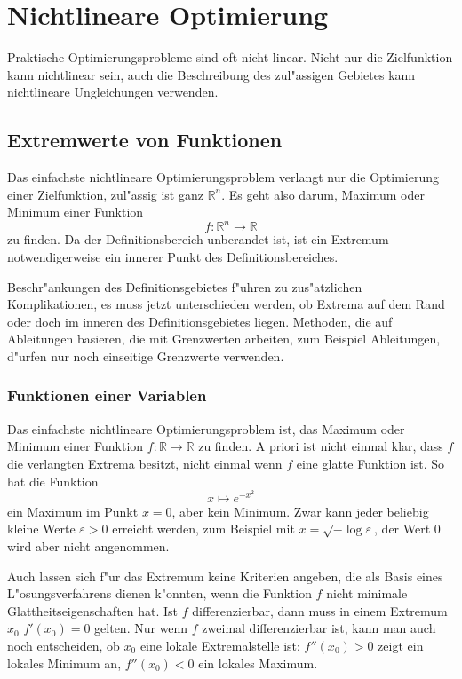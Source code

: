 \chapter{Nichtlineare Optimierung\label{chapter-nichtlineare-optimierung}}
Praktische Optimierungsprobleme sind oft nicht linear. 
Nicht nur die Zielfunktion kann nichtlinear sein, auch die
Beschreibung des zul"assigen Gebietes kann nichtlineare Ungleichungen
verwenden. 
\section{Extremwerte von Funktionen}
Das einfachste nichtlineare Optimierungsproblem verlangt nur die
Optimierung einer Zielfunktion, zul"assig ist ganz $\mathbb R^n$.
Es geht also darum, Maximum oder Minimum einer Funktion
\[
f\colon \mathbb R^n\to\mathbb R
\]
zu finden. Da der Definitionsbereich unberandet ist, ist ein
Extremum notwendigerweise ein innerer Punkt des Definitionsbereiches.

Beschr"ankungen des Definitionsgebietes f"uhren
zu zus"atzlichen Komplikationen, es muss jetzt unterschieden
werden, ob Extrema auf dem Rand oder doch im inneren des Definitionsgebietes
liegen.
Methoden, die auf Ableitungen basieren, die mit Grenzwerten
arbeiten, zum Beispiel Ableitungen, d"urfen nur noch einseitige
Grenzwerte verwenden.

\subsection{Funktionen einer Variablen}
Das einfachste nichtlineare Optimierungsproblem ist, das Maximum
oder Minimum einer Funktion $f\colon\mathbb R\to\mathbb R$ zu finden.
A priori ist nicht einmal klar, dass $f$ die verlangten Extrema
besitzt, nicht einmal wenn $f$ eine glatte Funktion ist. So hat
die Funktion
\[
x\mapsto e^{-x^2}
\]
ein Maximum im Punkt $x=0$, aber kein Minimum. Zwar kann jeder beliebig
kleine Werte $\varepsilon>0$ erreicht werden, zum Beispiel mit
$x=\sqrt{-\log \varepsilon}$, der Wert $0$ wird aber nicht angenommen.

Auch lassen sich f"ur das Extremum keine Kriterien angeben, die 
als Basis eines L"osungsverfahrens dienen k"onnten, wenn die Funktion
$f$ nicht minimale Glattheitseigenschaften hat.
Ist $f$ differenzierbar, dann muss in einem Extremum $x_0$
$f'(x_0)=0$ gelten. Nur wenn $f$ zweimal differenzierbar ist,
kann man auch noch entscheiden, ob $x_0$ eine lokale Extremalstelle
ist: $f''(x_0)>0$ zeigt ein lokales Minimum an, $f''(x_0) < 0$
ein lokales Maximum.


